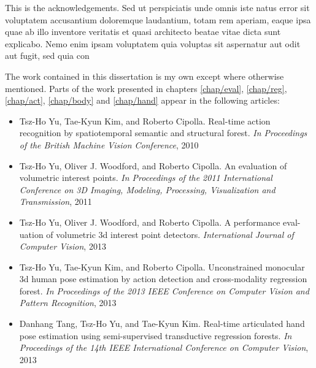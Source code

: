 \begin{abstracts}
	This is the acknowledgements. Sed ut perspiciatis unde omnis iste natus error sit voluptatem accusantium doloremque laudantium, totam rem aperiam, eaque ipsa quae ab illo inventore veritatis et quasi architecto beatae vitae dicta sunt explicabo. Nemo enim ipsam voluptatem quia voluptas sit aspernatur aut odit aut fugit, sed quia con
\end{abstracts}

\begin{declarations}
	The work contained in this dissertation is my own except where otherwise mentioned. Parts of the work presented in chapters \ref{chap/eval}, \ref{chap/reg}, \ref{chap/act}, \ref{chap/body} and \ref{chap/hand} appear in the following articles:
	\begin{itemize}[]
		\item Tsz-Ho Yu, Tae-Kyun Kim, and Roberto Cipolla. Real-time action recognition by spatiotemporal semantic and structural forest. \textit{In Proceedings of the British Machine Vision Conference}, 2010 %
		\item Tsz-Ho Yu, Oliver J. Woodford, and Roberto Cipolla. An evaluation of volumetric interest points. \textit{In Proceedings of the 2011 International Conference on 3D Imaging, Modeling, Processing, Visualization and Transmission}, 2011 %
		\item Tsz-Ho Yu, Oliver J. Woodford, and Roberto Cipolla. A performance eval-
			uation of volumetric 3d interest point detectors. \textit{International Journal of Computer Vision}, 2013 %
		\item Tsz-Ho Yu, Tae-Kyun Kim, and Roberto Cipolla. Unconstrained monocular 3d human pose estimation by action detection and cross-modality regression forest. \textit{In Proceedings of the 2013 IEEE Conference on Computer Vision and Pattern Recognition}, 2013 %
		\item Danhang Tang, Tsz-Ho Yu, and Tae-Kyun Kim. Real-time articulated hand pose estimation using semi-supervised transductive regression forests. \textit{In Proceedings of the 14th IEEE International Conference on Computer Vision}, 2013 %
	\end{itemize}
\end{declarations}
